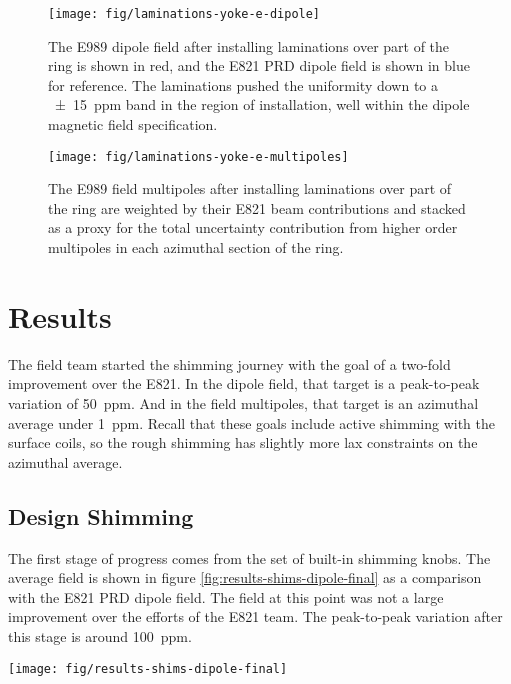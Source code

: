 \begin{figure}
\centering
\texttt{[image: fig/laminations-yoke-e-dipole]}
\caption{
    The E989 dipole field after installing laminations over part of the ring is shown in red, and the E821 PRD dipole field is shown in blue for reference.  The laminations pushed the uniformity down to a \SI{\pm15}{ppm} band in the region of installation, well within the dipole magnetic field specification.
    \label{fig:laminations-yoke-e-dipole}
}
\end{figure}

\begin{figure}
\centering
\texttt{[image: fig/laminations-yoke-e-multipoles]}
\caption{
    The E989 field multipoles after installing laminations over part of the ring are weighted by their E821 beam contributions and stacked as a proxy for the total uncertainty contribution from higher order multipoles in each azimuthal section of the ring. 
    \label{fig:laminations-yoke-e-multipoles}
}
\end{figure}

\section{Results}

The field team started the shimming journey with the goal of a two-fold improvement over the E821.  In the dipole field, that target is a peak-to-peak variation of \SI{50}{ppm}. And in the field multipoles, that target is an azimuthal average under \SI{1}{ppm}.  Recall that these goals include active shimming with the surface coils, so the rough shimming has slightly more lax constraints on the azimuthal average.

\subsection{Design Shimming}

The first stage of progress comes from the set of built-in shimming knobs.  The average field is shown in figure \ref{fig:results-shims-dipole-final} as a comparison with the E821 PRD dipole field.  The field at this point was not a large improvement over the efforts of the E821 team.  The peak-to-peak variation after this stage is around \SI{100}{ppm}.

\begin{sidewaysfigure}
\centering
\texttt{[image: fig/results-shims-dipole-final]}
\caption{
    The plot depicts the rough shimming dipole field compared to E821 after full optimization using the built-in shimming kit.  The E821 field has a better standard deviation, \SI{30}{ppm} versus \SI{40}{ppm}, and a similar peak-to-peak value for the average field. 
    \label{fig:results-shims-dipole-final}
}
\end{sidewaysfigure}

